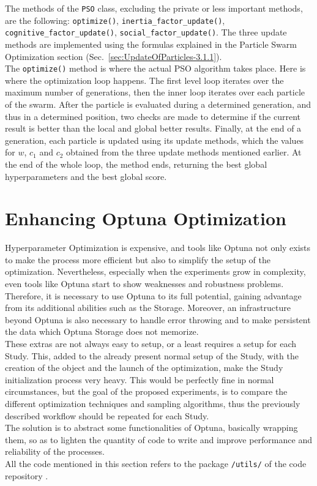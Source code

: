 %
The methods of the \texttt{PSO} class, excluding the private or less important methods, are the following: \texttt{optimize()}, \texttt{inertia\_factor\_update()}, \texttt{cognitive\_factor\_update()}, \texttt{social\_factor\_update()}.
The three update methods are implemented using the formulas explained in the Particle Swarm Optimization section (Sec.~\ref{sec:UpdateOfParticles-3.1.1}).
\\[0.3cm]The \texttt{optimize()} method is where the actual PSO algorithm takes place. Here is where the optimization loop happens. The first level loop iterates over the maximum number of generations, then the inner loop iterates over each particle of the swarm.
After the particle is evaluated during a determined generation, and thus in a determined position, two checks are made to determine if the current result is better than the local and global better results.
Finally, at the end of a generation, each particle is updated using its update methods, which the values for $w$, $c_1$ and $c_2$ obtained from the three update methods mentioned earlier.
At the end of the whole loop, the method ends, returning the best global hyperparameters and the best global score.

\section{Enhancing Optuna Optimization}\label{sec:EnhancingOptuna-3.3}

Hyperparameter Optimization is expensive, and tools like Optuna not only exists to make the process more efficient but also to simplify the setup of the optimization.
Nevertheless, especially when the experiments grow in complexity, even tools like Optuna start to show weaknesses and robustness problems.
\\[0.3cm]Therefore, it is necessary to use Optuna to its full potential, gaining advantage from its additional abilities such as the Storage. Moreover, an infrastructure beyond Optuna is also necessary to handle error throwing and to make persistent the data which Optuna Storage does not memorize.
\\[0.3cm]These extras are not always easy to setup, or a least requires a setup for each Study. This, added to the already present normal setup of the Study, with the creation of the object and the launch of the optimization, make the Study initialization process very heavy.
This would be perfectly fine in normal circumstances, but the goal of the proposed experiments, is to compare the different optimization techniques and sampling algorithms, thus the previously described workflow should be repeated for each Study.
\\[0.3cm]The solution is to abstract some functionalities of Optuna, basically wrapping them, so as to lighten the quantity of code to write and improve performance and reliability of the processes.
\\[0.3cm]All the code mentioned in this section refers to the package \texttt{/utils/} of the code repository \cite{Repository-THESIS}.

